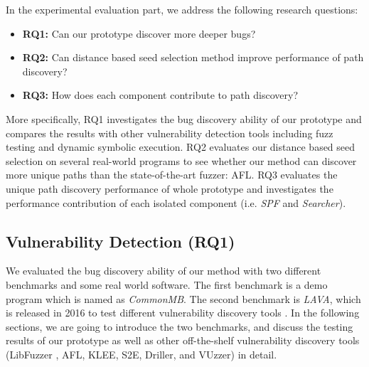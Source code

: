 In the experimental evaluation part, we address the following research questions:
\begin{itemize}
\setlength{\itemsep}{0pt}
\item {\textbf{RQ1:} Can our prototype discover more deeper bugs?}
\item {\textbf{RQ2:} Can distance based seed selection method improve performance of path discovery?}
\item {\textbf{RQ3:} How does each component contribute to path discovery?}
\end{itemize}

More specifically, RQ1 investigates the bug discovery ability of our prototype and compares the results with other vulnerability detection tools including fuzz testing and dynamic symbolic execution. RQ2 evaluates our distance based seed selection on several real-world programs to see whether our method can discover more unique paths than the state-of-the-art fuzzer: AFL. RQ3 evaluates the unique path discovery performance of whole prototype and investigates the performance contribution of each isolated component (i.e. \textit{SPF} and \textit{Searcher}).


\subsection{Vulnerability Detection (RQ1)}
We evaluated the bug discovery ability of our method with two different benchmarks and some real world software. The first benchmark is a demo program which is named as \emph{CommonMB}. The second benchmark is \emph{LAVA}, which is released in 2016 to test different vulnerability discovery tools \cite{dolan2016lava}. In the following sections, we are going to introduce the two benchmarks, and discuss the testing results of our prototype as well as other off-the-shelf vulnerability discovery tools (LibFuzzer \cite{libfuzzer}, AFL, KLEE, S2E, Driller, and VUzzer) in detail.

